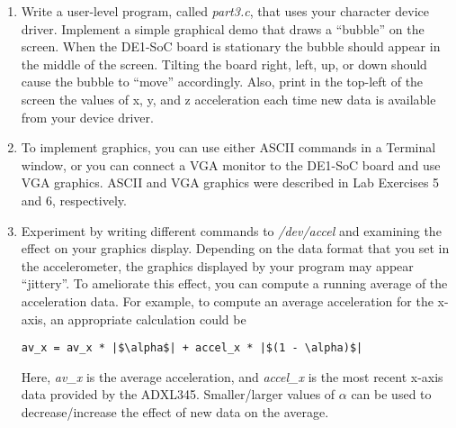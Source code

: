 \documentclass[epsfig,10pt,fullpage]{article}
\begin{document}
\begin{enumerate}
\begin{figure}[h]
\begin{center}
\begin{minipage}[t]{15 cm}
\begin{lstlisting}[name=dots]
static ssize_t device_read(struct file *filp, char *buffer, size_t length, loff_t *offset) {
	|$\ldots$| code not shown
}
\end{lstlisting}
\end{minipage}
\caption{An outline of the ADXL345 device driver code.}
\label{fig:accel}
\end{center}
\end{figure}
\clearpage
\item Write a user-level program, called {\it part3.c}, that uses your character device driver.
Implement a simple graphical demo that draws a ``bubble'' on the screen. When the DE1-SoC
board is stationary the bubble should appear in the middle of the screen. Tilting the
board right, left, up, or down should cause the bubble to ``move'' accordingly.
Also, print in the top-left of the screen the values of x, y, and z acceleration each time
new data is available from your device driver.
\item To implement graphics, you can use either ASCII commands in a Terminal window, or you can
connect a VGA monitor to the DE1-SoC board and use VGA graphics.  ASCII and VGA graphics were
described in Lab Exercises 5 and 6, respectively.
\item Experiment by writing different commands to {\it /dev/accel} and examining the effect
on your graphics display. Depending on the data format that you set in the accelerometer,
the graphics displayed by your program may appear ``jittery''. To ameliorate this effect,
you can compute a running average of the acceleration data. For example, to compute an
average acceleration for the x-axis, an appropriate calculation could be
\lstset{language=C,numbers=none}
\begin{lstlisting}
av_x = av_x * |$\alpha$| + accel_x * |$(1 - \alpha)$|
\end{lstlisting}
Here, {\it av\_x} is the average acceleration, and {\it accel\_x} is the most recent
x-axis data provided by the ADXL345. Smaller/larger values of $\alpha$ can be used to
decrease/increase the effect of new data on the average.
\end{enumerate}
\end{document}
